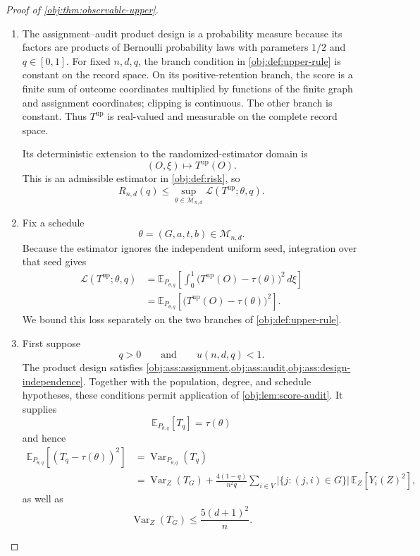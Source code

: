 \begin{proof}[Proof of \cref{obj:thm:observable-upper}]
\begin{enumerate}
\item
The assignment--audit product design is a probability measure because its factors are products of Bernoulli probability laws with parameters \(1/2\) and \(q\in[0,1]\). For fixed \(n,d,q\), the branch condition in \cref{obj:def:upper-rule} is constant on the record space. On its positive-retention branch, the score is a finite sum of outcome coordinates multiplied by functions of the finite graph and assignment coordinates; clipping is continuous. The other branch is constant. Thus \(T^{\mathrm{up}}\) is real-valued and measurable on the complete record space.

Its deterministic extension to the randomized-estimator domain is
\[
(O,\xi)\longmapsto T^{\mathrm{up}}(O).
\]
This is an admissible estimator in \cref{obj:def:risk}, so
\[
R_{n,d}(q)
\le
\sup_{\theta\in\mathcal M_{n,d}}
\mathcal L(T^{\mathrm{up}};\theta,q).
\]

\item
Fix a schedule
\[
\theta=(G,a,t,b)\in\mathcal M_{n,d}.
\]
Because the estimator ignores the independent uniform seed, integration over that seed gives
\[
\begin{aligned}
\mathcal L(T^{\mathrm{up}};\theta,q)
&=
\mathbb E_{P_{\theta,q}}
\left[
\int_0^1
\bigl(T^{\mathrm{up}}(O)-\tau(\theta)\bigr)^2\,d\xi
\right]\\
&=
\mathbb E_{P_{\theta,q}}
\left[
\bigl(T^{\mathrm{up}}(O)-\tau(\theta)\bigr)^2
\right].
\end{aligned}
\]
We bound this loss separately on the two branches of \cref{obj:def:upper-rule}.

\item
First suppose
\[
q>0
\qquad\text{and}\qquad
u(n,d,q)<1.
\]
The product design satisfies \cref{obj:ass:assignment,obj:ass:audit,obj:ass:design-independence}. Together with the population, degree, and schedule hypotheses, these conditions permit application of \cref{obj:lem:score-audit}. It supplies
\[
\mathbb E_{P_{\theta,q}}[T_q]=\tau(\theta)
\]
and hence
\[
\begin{aligned}
\mathbb E_{P_{\theta,q}}
\left[(T_q-\tau(\theta))^2\right]
&=\operatorname{Var}_{P_{\theta,q}}(T_q)\\
&=\operatorname{Var}_{Z}(T_G)
+\frac{4(1-q)}{n^2q}
\sum_{i\in V}
\bigl|\{j:(j,i)\in G\}\bigr|
\,\mathbb E_Z[Y_i(Z)^2],
\end{aligned}
\]
as well as
\[
\operatorname{Var}_{Z}(T_G)\le\frac{5(d+1)^2}{n}.
\]


\end{enumerate}
\end{proof}
